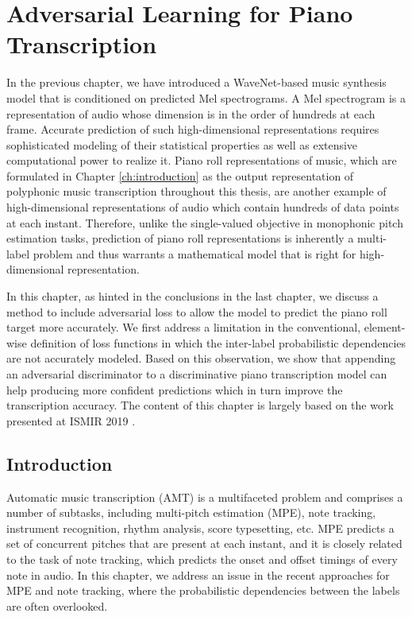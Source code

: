 
\graphicspath{{6-adversarial/figures/}}

\chapter{Adversarial Learning for Piano Transcription}
\label{ch:adversarial}

In the previous chapter, we have introduced a WaveNet-based music synthesis model that is conditioned on predicted Mel spectrograms.
A Mel spectrogram is a representation of audio whose dimension is in the order of hundreds at each frame.
Accurate prediction of such high-dimensional representations requires sophisticated modeling of their statistical properties as well as extensive computational power to realize it.
Piano roll representations of music, which are formulated in Chapter \ref{ch:introduction} as the output representation of polyphonic music transcription throughout this thesis, are another example of high-dimensional representations of audio which contain hundreds of data points at each instant.
Therefore, unlike the single-valued objective in monophonic pitch estimation tasks, prediction of piano roll representations is inherently a multi-label problem and thus warrants a mathematical model that is right for high-dimensional representation.

In this chapter, as hinted in the conclusions in the last chapter, we discuss a method to include adversarial loss to allow the model to predict the piano roll target more accurately.
We first address a limitation in the conventional, element-wise definition of loss functions in which the inter-label probabilistic dependencies are not accurately modeled.
Based on this observation, we show that appending an adversarial discriminator to a discriminative piano transcription model can help producing more confident predictions which in turn improve the transcription accuracy.
The content of this chapter is largely based on the work presented at ISMIR 2019 \cite{kim2019adversarial}.


\section{Introduction}

Automatic music transcription (AMT) is a multifaceted problem and comprises a number of subtasks, including multi-pitch estimation (MPE), note tracking, instrument recognition, rhythm analysis, score typesetting, etc.
MPE predicts a set of concurrent pitches that are present at each instant, and it is closely related to the task of note tracking, which predicts the onset and offset timings of every note in audio.
In this chapter, we address an issue in the recent approaches for MPE and note tracking, where the probabilistic dependencies between the labels are often overlooked.

